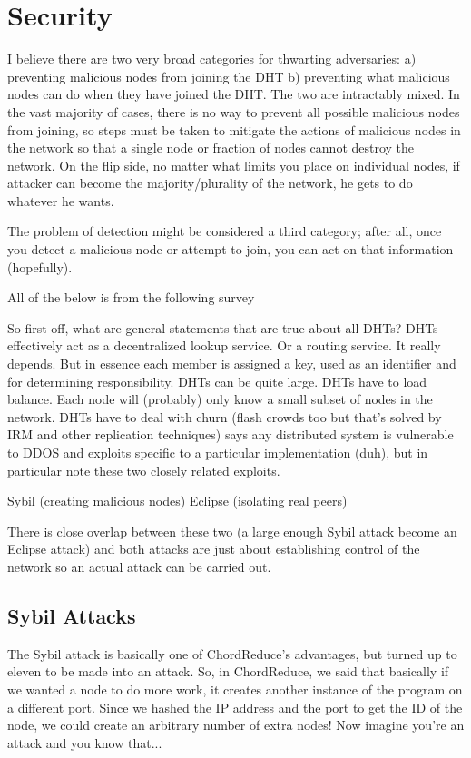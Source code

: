 \documentclass[10pt,letterpaper]{report}
\begin{document}
\section{Security}

I believe there are two very broad categories for thwarting adversaries:  a)  preventing malicious nodes from joining the DHT b) preventing what malicious nodes can do when they have joined the DHT.  The two are intractably mixed.  In the vast majority of cases, there is no way to prevent all possible malicious nodes from joining, so steps must be taken to mitigate the actions of malicious nodes in the network so that a single node or fraction of nodes cannot destroy the network.  On the flip side, no matter what limits you place on individual nodes, if attacker can become the majority/plurality of the network, he gets to do whatever he wants.

The problem of detection might be considered a third category;  after all, once you detect a malicious node or attempt to join, you can act on that information (hopefully).

All of the below is from the following survey \cite{dhtsec}


So first off, what are general statements that are true about all DHTs?
DHTs  effectively act as a decentralized lookup service.  Or a routing service.  It really depends.  But in essence each member is assigned a key, used as an identifier and for determining responsibility.
DHTs can be quite large.
DHTs have to load balance.
Each node will (probably) only know a small subset of nodes in the network.
DHTs have to deal with churn (flash crowds too but that's solved by IRM and other replication techniques)
\cite{dhtsec} says any distributed system is vulnerable to DDOS and exploits specific to a particular implementation (duh), but in particular note these two closely related exploits. 

Sybil (creating malicious nodes)
Eclipse (isolating real peers)

There is close overlap between these two (a large enough Sybil attack become an Eclipse attack) and both attacks are just about establishing control of the network so an actual attack can be carried out.




\subsection{Sybil Attacks}
The Sybil attack is basically one of ChordReduce's advantages, but turned up to eleven to be made into an attack.  So, in ChordReduce, we said that basically if we wanted a node to do more work,  it creates another instance of the program on a different port.  Since we hashed the IP address and the port to get the ID of the node, we could create an arbitrary number of extra nodes!  Now imagine you're an attack and you know that...
\end{document}
